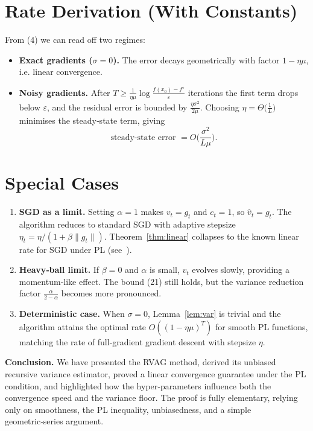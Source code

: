 \documentclass{article}
\begin{document}
\section*{Rate Derivation (With Constants)}
From (4) we can read off two regimes:

\begin{itemize}
\item \textbf{Exact gradients ($\sigma=0$).} The error decays geometrically with factor $1-\eta\mu$, i.e. linear convergence.
\item \textbf{Noisy gradients.} After $T\ge\frac{1}{\eta\mu}\log\frac{f(x_{0})-f^{\star}}{\varepsilon}$ iterations the first term drops below $\varepsilon$, and the residual error is bounded by $\frac{\eta\sigma^{2}}{2\mu}$. Choosing $\eta=\Theta\!\bigl(\frac{1}{L}\bigr)$ minimises the steady‑state term, giving
\[
\text{steady‑state error }=O\!\bigl(\frac{\sigma^{2}}{L\mu}\bigr).
\]
\end{itemize}

\section*{Special Cases}
\begin{enumerate}
\item \textbf{SGD as a limit.} Setting $\alpha=1$ makes $v_{t}=g_{t}$ and $c_{t}=1$, so $\widehat v_{t}=g_{t}$. The algorithm reduces to standard SGD with adaptive stepsize $\eta_{t}= \eta/(1+\beta\|g_{t}\|)$. Theorem~\ref{thm:linear} collapses to the known linear rate for SGD under PL (see~\cite{karimi2016linear}).
\item \textbf{Heavy‑ball limit.} If $\beta=0$ and $\alpha$ is small, $v_{t}$ evolves slowly, providing a momentum‑like effect. The bound (21) still holds, but the variance reduction factor $\frac{\alpha}{2-\alpha}$ becomes more pronounced.
\item \textbf{Deterministic case.} When $\sigma=0$, Lemma~\ref{lem:var} is trivial and the algorithm attains the optimal rate $O((1-\eta\mu)^{T})$ for smooth PL functions, matching the rate of full‑gradient gradient descent with stepsize $\eta$.
\end{enumerate}

\bigskip
\noindent\textbf{Conclusion.}  
We have presented the RVAG method, derived its unbiased recursive variance estimator, proved a linear convergence guarantee under the PL condition, and highlighted how the hyper‑parameters influence both the convergence speed and the variance floor. The proof is fully elementary, relying only on smoothness, the PL inequality, unbiasedness, and a simple geometric‑series argument.
\end{document}
